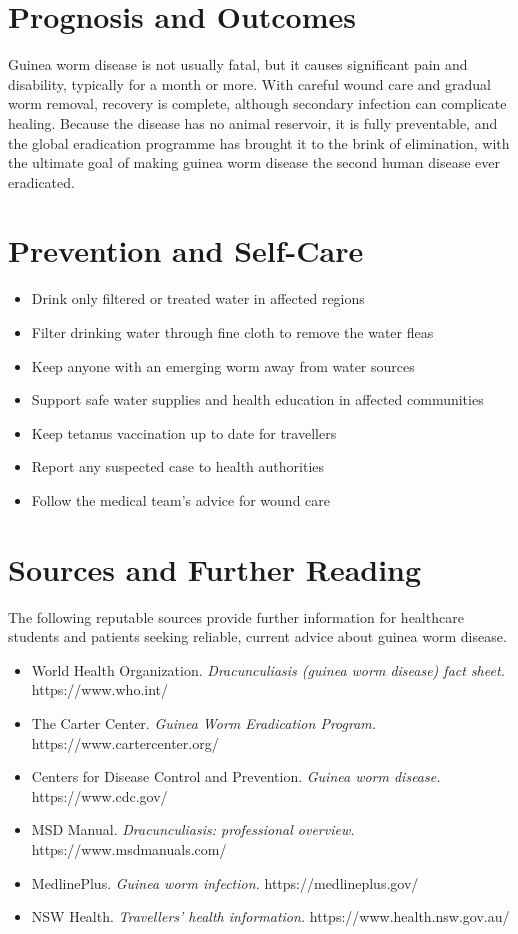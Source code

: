 \section*{Prognosis and Outcomes}
Guinea worm disease is not usually fatal, but it causes significant pain and disability, typically for a month or more. With careful wound care and gradual worm removal, recovery is complete, although secondary infection can complicate healing. Because the disease has no animal reservoir, it is fully preventable, and the global eradication programme has brought it to the brink of elimination, with the ultimate goal of making guinea worm disease the second human disease ever eradicated.

\section*{Prevention and Self-Care}
\begin{itemize}
    \item Drink only filtered or treated water in affected regions
    \item Filter drinking water through fine cloth to remove the water fleas
    \item Keep anyone with an emerging worm away from water sources
    \item Support safe water supplies and health education in affected communities
    \item Keep tetanus vaccination up to date for travellers
    \item Report any suspected case to health authorities
    \item Follow the medical team's advice for wound care
\end{itemize}

\section*{Sources and Further Reading}
The following reputable sources provide further information for healthcare students and patients seeking reliable, current advice about guinea worm disease.

\begin{itemize}
    \item World Health Organization. \textit{Dracunculiasis (guinea worm disease) fact sheet.} https://www.who.int/
    \item The Carter Center. \textit{Guinea Worm Eradication Program.} https://www.cartercenter.org/
    \item Centers for Disease Control and Prevention. \textit{Guinea worm disease.} https://www.cdc.gov/
    \item MSD Manual. \textit{Dracunculiasis: professional overview.} https://www.msdmanuals.com/
    \item MedlinePlus. \textit{Guinea worm infection.} https://medlineplus.gov/
    \item NSW Health. \textit{Travellers' health information.} https://www.health.nsw.gov.au/
\end{itemize}
